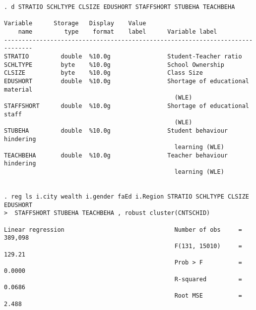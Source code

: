 \documentclass[10pt, letterpaper]{article}
\begin{document}
\begin{spacing}{1.4}
\begin{spacing}{.5}
\begin{scriptsize}
\begin{verbatim}
. d STRATIO SCHLTYPE CLSIZE EDUSHORT STAFFSHORT STUBEHA TEACHBEHA 

Variable      Storage   Display    Value
    name         type    format    label      Variable label
------------------------------------------------------------------------------
STRATIO         double  %10.0g                Student-Teacher ratio
SCHLTYPE        byte    %10.0g                School Ownership
CLSIZE          byte    %10.0g                Class Size
EDUSHORT        double  %10.0g                Shortage of educational material
                                                (WLE)
STAFFSHORT      double  %10.0g                Shortage of educational staff
                                                (WLE)
STUBEHA         double  %10.0g                Student behaviour hindering
                                                learning (WLE)
TEACHBEHA       double  %10.0g                Teacher behaviour hindering
                                                learning (WLE)


. reg ls i.city wealth i.gender faEd i.Region STRATIO SCHLTYPE CLSIZE EDUSHORT
>  STAFFSHORT STUBEHA TEACHBEHA , robust cluster(CNTSCHID)

Linear regression                               Number of obs     =    389,098
                                                F(131, 15010)     =     129.21
                                                Prob > F          =     0.0000
                                                R-squared         =     0.0686
                                                Root MSE          =      2.488


\end{verbatim}
\end{scriptsize}
\end{spacing}
\end{spacing}
\end{document}
